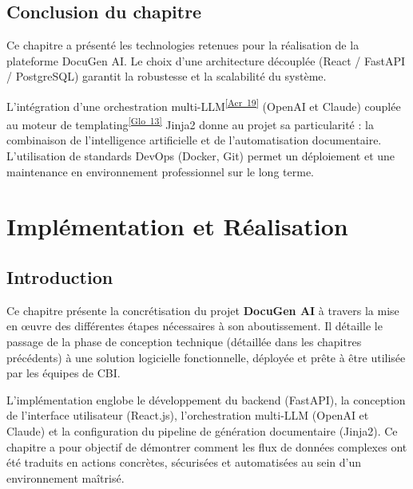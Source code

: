 \documentclass[12pt, a4paper]{report}
\newcommand{\acref}[1]{\textsuperscript{\hyperlink{acr:#1}{[Acr~#1]}}}
\newcommand{\gloref}[1]{\textsuperscript{\hyperlink{glo:#1}{[Glo~#1]}}}
\begin{document}
\section*{Conclusion du chapitre}
Ce chapitre a présenté les technologies retenues pour la réalisation de la plateforme DocuGen AI. Le choix d'une architecture découplée (React / FastAPI / PostgreSQL) garantit la robustesse et la scalabilité du système. 

L'intégration d'une orchestration multi-LLM\acref{19} (OpenAI et Claude) couplée au moteur de templating\gloref{13} Jinja2 donne au projet sa particularité : la combinaison de l'intelligence artificielle et de l'automatisation documentaire. L'utilisation de standards DevOps (Docker, Git) permet un déploiement et une maintenance en environnement professionnel sur le long terme.

\chapter{Implémentation et Réalisation}

\section*{Introduction}
Ce chapitre présente la concrétisation du projet \textbf{DocuGen AI} à travers la mise en œuvre des différentes étapes nécessaires à son aboutissement. Il détaille le passage de la phase de conception technique (détaillée dans les chapitres précédents) à une solution logicielle fonctionnelle, déployée et prête à être utilisée par les équipes de CBI.

L’implémentation englobe le développement du backend (FastAPI), la conception de l'interface utilisateur (React.js), l'orchestration multi-LLM (OpenAI et Claude) et la configuration du pipeline de génération documentaire (Jinja2). Ce chapitre a pour objectif de démontrer comment les flux de données complexes ont été traduits en actions concrètes, sécurisées et automatisées au sein d’un environnement maîtrisé.

\end{document}
